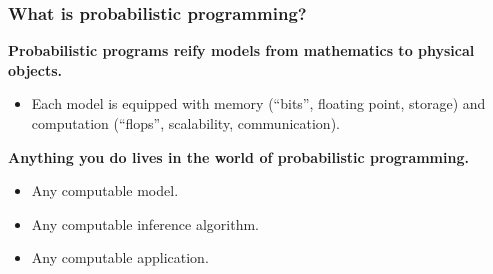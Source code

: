 \documentclass[10pt,
               xcolor={usenames,dvipsnames},
               hyperref={colorlinks,linktoc=all,citecolor=Plum,linkcolor=MidnightBlue,urlcolor=MidnightBlue},noamssymb]{beamer}
\begin{document}
\begin{frame}
\frametitle{What is probabilistic programming?}
\textbf{Probabilistic programs reify models from mathematics to
physical objects.}
\begin{itemize}
\vspace{-2ex}
\item
Each model is equipped with memory (``bits'',
floating point, storage) and computation
(``flops'', scalability, communication).
\end{itemize}
\textbf{Anything you do lives in the world of probabilistic programming.}
\begin{itemize}
\item
Any computable model.

\item
Any computable inference algorithm.

\item
Any computable application.

\end{itemize}
\end{frame}

\end{document}

